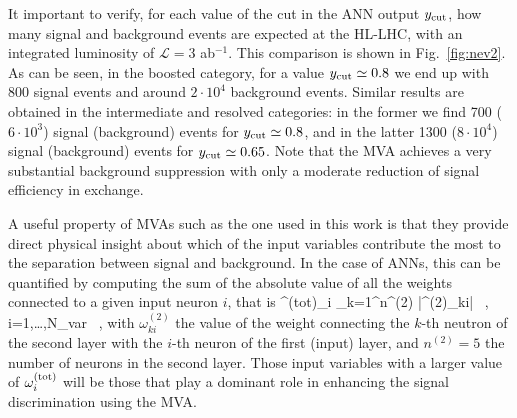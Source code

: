 It important to verify, for each value of
the cut in the ANN output $y_{\rm cut}$, how many
signal and background events are expected at the HL-LHC,
with an integrated luminosity of $\mathcal{L}=3$ ab$^{-1}$.
%
This comparison is shown in 
Fig.~\ref{fig:nev2}.
%
As can be seen,
in the boosted category, for a value $y_{\rm cut}\simeq 0.8$
we end up with 800 signal events and around $2\cdot 10^4$ background
events.
%
Similar results are obtained in the intermediate and resolved
categories: in the former we find 700 ($6\cdot 10^3$) signal (background)
events for $y_{\rm cut}\simeq 0.8$, and in the latter
1300 ($8\cdot 10^4$) signal (background) events for
$y_{\rm cut}\simeq 0.65$.
%
Note that the MVA achieves a very substantial background suppression
with only a
moderate reduction of signal efficiency in exchange.


A useful property of MVAs such as the one used in this work
is that they provide direct  physical insight about which of the
input variables contribute the most to the separation between
signal and background.
%
In the case of ANNs, this can be quantified by computing the sum
of the absolute value of all the weights connected to a given
input neuron $i$, that is
\be
\label{eq:totweight}
\omega^{\rm (tot)}_i \equiv \sum_{k=1}^{n^{(2)}} \Big|\omega^{(2)}_{ki}\Big| \, ,
\qquad i=1,\ldots,N_{\rm var} \, ,
\ee
with $\omega^{(2)}_{ki}$ the value of the weight connecting
the $k$-th neutron of the second layer with the $i$-th neuron of
the first (input) layer, and $n^{(2)}=5$ the number of
neurons in the second layer.
%
Those input variables with a larger value of $\omega^{\rm (tot)}_i$ will be those
that play a dominant role in enhancing the signal
discrimination using the MVA.


